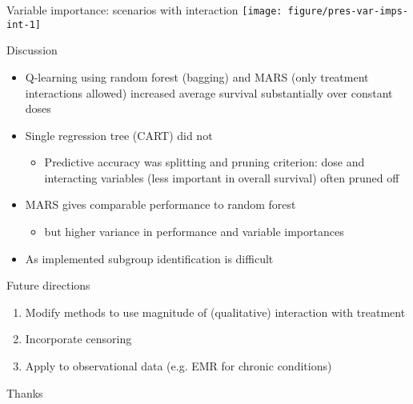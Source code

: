 \documentclass{beamer}
\begin{document}
\begin{frame}[c]{Variable importance: scenarios with interaction}
  \centering
  \texttt{[image: figure/pres-var-imps-int-1]} 
\end{frame}


\begin{frame}[t]{Discussion}
  \begin{itemize}[<+->]
    \item Q-learning using random forest (bagging) and MARS (only treatment interactions allowed) increased average survival substantially over constant doses
    \item Single regression tree (CART) did not
    \begin{itemize}
      \item Predictive accuracy was splitting and pruning criterion: dose and interacting variables (less important in overall survival) often pruned off 
    \end{itemize}
    \item MARS gives comparable performance to random forest
    \begin{itemize}
      \item but higher variance in performance and variable importances
    \end{itemize} 
    \item As implemented subgroup identification is difficult
  \end{itemize}
\end{frame}

\begin{frame}[c]{Future directions}
  \begin{enumerate}[<+->]
    \item Modify methods to use magnitude of (qualitative) interaction with treatment
    
    \bigskip
    
    \item Incorporate censoring
    
    \bigskip
    
    \item Apply to observational data (e.g. EMR for chronic conditions)
  \end{enumerate}
\end{frame}



\begin{frame}[standout]
  Thanks
\end{frame}
\end{document}
